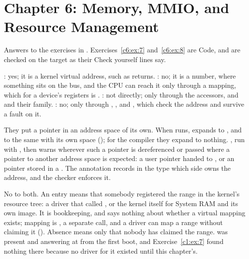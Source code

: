 
\section{Chapter 6: Memory, MMIO, and Resource Management}
\label{sol:sec:c6}
Answers to the exercises in . Exercises~\ref{c6:ex:7} and~\ref{c6:ex:8}
are Code, and are checked on the target as their Check yourself lines say.


 : yes; it is a kernel virtual address, such as  returns.
: no; it is a number, where something sits on the bus, and the CPU can reach it
only through a mapping, which for a device's registers is . : not
directly; only through the accessors,  and  and their family.
: no; only through , ,
 and , which check the address and survive a fault on it.

 They put a pointer in an address space of its own. When  runs,
 expands to , and
 to the same with its own space (); for the
compiler they expand to nothing. , run with , then warns wherever such a
pointer is dereferenced or passed where a pointer to another address space is expected: a user
pointer handed to , or an  pointer stored in a . The
annotation records in the type which side owns the address, and the checker enforces it.

 No to both. An entry means that somebody registered the range in the kernel's resource
tree: a driver that called , or the kernel itself for System RAM and its
own image. It is bookkeeping, and says nothing about whether a virtual mapping exists; mapping is
, a separate call, and a driver can map a range without claiming it
(). Absence means only that nobody has claimed the range.  was
present and answering at  from the first boot, and Exercise~\ref{c1:ex:7} found
nothing there because no driver for it existed until this chapter's.

